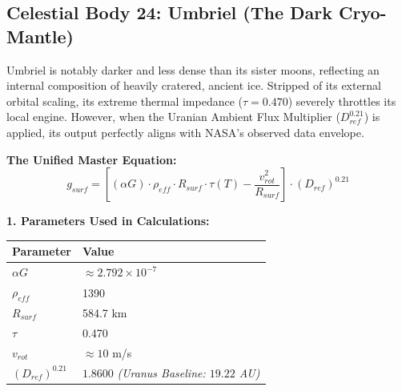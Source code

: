 \documentclass[11pt, a4paper]{article}
\begin{document}
\clearpage
\subsection{Celestial Body 24: Umbriel (The Dark Cryo-Mantle)}
  Umbriel is notably darker and less dense than its sister moons, reflecting an internal composition of heavily cratered, ancient ice. Stripped of its external orbital scaling, its extreme thermal impedance ($\tau = 0.470$) severely throttles its local engine. However, when the Uranian Ambient Flux Multiplier ($D_{ref}^{0.21}$) is applied, its output perfectly aligns with NASA's observed data envelope.

  \vspace{0.5em}
  \noindent \textbf{The Unified Master Equation:}
  $$ g_{surf} = \left[ (\alpha G) \cdot \rho_{eff} \cdot R_{surf} \cdot \tau(T) - \frac{v_{rot}^2}{R_{surf}} \right] \cdot (D_{ref})^{0.21} $$

  \vspace{0.5em}
  \noindent \textbf{1. Parameters Used in Calculations:} \\[0.5em]
  \begingroup
  \renewcommand{\arraystretch}{1.3}
  \hspace*{2em}
  \begin{tabular}{|l|l|}
    \hline
    \textbf{Parameter} & \textbf{Value} \\ \hline
    $\alpha G$ & $\approx 2.792 \times 10^{-7}$ \\ \hline
    $\rho_{eff}$ & 1390 \\ \hline
    $R_{surf}$ & 584.7 km \\ \hline
    $\tau$ & 0.470 \\ \hline
    $v_{rot}$ & $\approx 10$ m/s \\ \hline
    $(D_{ref})^{0.21}$ & $1.8600$ \textit{(Uranus Baseline: $19.22$ AU)} \\ \hline
  \end{tabular}
  \endgroup
\end{document}

